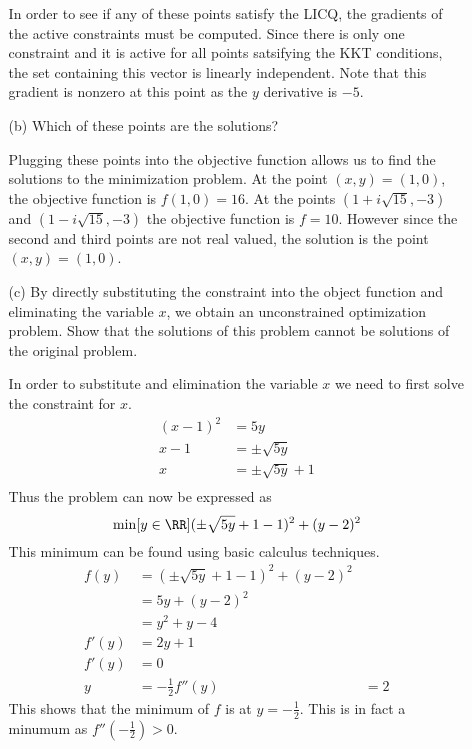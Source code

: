 \documentclass[11pt, oneside]{article}
\begin{document}
\begin{enumerate}
\begin{enumerate}
        In order to see if any of these points satisfy the LICQ, the gradients
        of the active constraints must be computed.
        Since there is only one constraint and it is active for all points
        satsifying the KKT conditions, the set containing this vector is
        linearly independent.
        Note that this gradient is nonzero at this point as the $y$ derivative
        is $-5$.

      \item[(b)] %
        Which of these points are the solutions?

        Plugging these points into the objective function allows us to find the
        solutions to the minimization problem.
        At the point $(x, y) = (1, 0)$, the objective function is $f(1, 0) = 16$.
        At the points $(1 + i\sqrt{15}, -3)$ and $(1 - i\sqrt{15}, -3)$ the
        objective function is $f = 10$.
        However since the second and third points are not real valued, the
        solution is the point $(x, y) = (1, 0)$.

      \item[(c)] %
        By directly substituting the constraint into the object function and
        eliminating the variable $x$, we obtain an unconstrained optimization
        problem.
        Show that the solutions of this problem cannot be solutions of the
        original problem.

        In order to substitute and elimination the variable $x$ we need to first
        solve the constraint for $x$.
        \begin{align*}
          (x - 1)^2 &= 5y \\
          x - 1 &= \pm\sqrt{5y} \\
          x &= \pm\sqrt{5y} + 1 \\
        \end{align*}
        Thus the problem can now be expressed as
        \[
          \min[y \in \RR]{(\pm\sqrt{5y} + 1 - 1)^2 + (y - 2)^2}
        \]
        This minimum can be found using basic calculus techniques.
        \begin{align*}
          f(y) &= (\pm\sqrt{5y} + 1 - 1)^2 + (y - 2)^2 \\
          &= 5y + (y - 2)^2 \\
          &= y^2 + y - 4 \\
          f'(y) &= 2y + 1 \\
          f'(y) &= 0 \\
          y &= -\frac{1}{2}
          f''(y) &= 2
        \end{align*}
        This shows that the minimum of $f$ is at $y = -\frac{1}{2}$.
        This is in fact a minumum as $f''(-\frac{1}{2}) > 0$.


\end{enumerate}
\end{enumerate}
\end{document}
